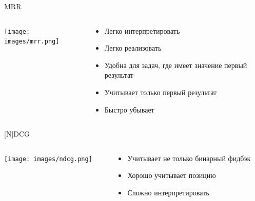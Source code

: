 \documentclass[11pt,aspectratio=169,handout]{beamer}
\begin{document}
\begin{frame}{MRR}

\begin{columns}
\begin{column}{0.5\textwidth}
   \begin{center}
		\texttt{[image: images/mrr.png]}
   \end{center}
\end{column}
\begin{column}{0.4\textwidth}
    \begin{tcolorbox}[colback=info!5,colframe=info!80,title=]
      \begin{itemize}
      \item Легко интерпретировать
      \item Легко реализовать
      \item Удобна для задач, где имеет значение первый результат
      \end{itemize}
    \end{tcolorbox}
    \begin{tcolorbox}[colback=warn!5,colframe=warn!80,title=]
      \begin{itemize}
      \item Учитывает только первый результат
      \item Быстро убывает
      \end{itemize}
    \end{tcolorbox}
\end{column}
\end{columns}

\end{frame}

\begin{frame}{[N]DCG}

\begin{columns}
\begin{column}{0.5\textwidth}
   \begin{center}
		\texttt{[image: images/ndcg.png]}
   \end{center}
\end{column}
\begin{column}{0.4\textwidth}
    \begin{tcolorbox}[colback=info!5,colframe=info!80,title=]
      \begin{itemize}
      \item Учитывает не только бинарный фидбэк
      \item Хорошо учитывает позицию
      \end{itemize}
    \end{tcolorbox}
    \begin{tcolorbox}[colback=warn!5,colframe=warn!80,title=]
      \begin{itemize}
      \item Сложно интерпретировать
      \end{itemize}
    \end{tcolorbox}
\end{column}
\end{columns}

\end{frame}
\end{document}
